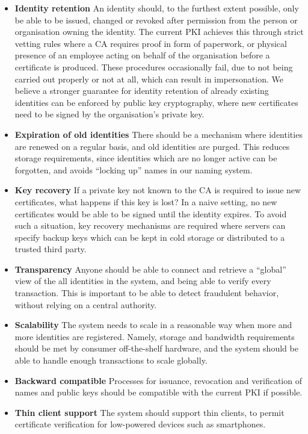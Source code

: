 \documentclass{style/kththesis}
\begin{document}
\begin{itemize}
    \item \textbf{Identity retention} An identity should, to the furthest extent possible, only be able to be issued, changed or revoked after permission from the person or organisation owning the identity. The current PKI achieves this through strict vetting rules where a CA requires proof in form of paperwork, or physical presence of an employee acting on behalf of the organisation before a certificate is produced. These procedures occasionally fail, due to not being carried out properly or not at all, which can result in impersonation. We believe a stronger guarantee for identity retention of already existing identities can be enforced by public key cryptography, where new certificates need to be signed by the organisation's private key.
    \item \textbf{Expiration of old identities} There should be a mechanism where identities are renewed on a regular basis, and old identities are purged. This reduces storage requirements, since identities which are no longer active can be forgotten, and avoids ``locking up'' names in our naming system. 
    \item \textbf{Key recovery} If a private key not known to the CA is required to issue new certificates, what happens if this key is lost? In a naive setting, no new certificates would be able to be signed until the identity expires. To avoid such a situation, key recovery mechanisms are required where servers can specify backup keys which can be kept in cold storage or distributed to a trusted third party.
    \item \textbf{Transparency} Anyone should be able to connect and retrieve a ``global'' view of the all identities in the system, and being able to verify every transaction. This is important to be able to detect fraudulent behavior, without relying on a central authority.
    \item \textbf{Scalability} The system needs to scale in a reasonable way when more and more identities are registered. Namely, storage and bandwidth requirements should be met by consumer off-the-shelf hardware, and the system should be able to handle enough transactions to scale globally.
    \item \textbf{Backward compatible} Processes for issuance, revocation and verification of names and public keys should be compatible with the current PKI if possible.
    \item \textbf{Thin client support} The system should support thin clients, to permit certificate verification for low-powered devices such as smartphones.
\end{itemize}
\end{document}
